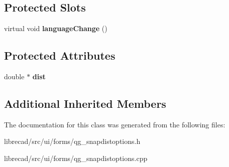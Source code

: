 \subsection*{Protected Slots}
\begin{DoxyCompactItemize}
\item 
\hypertarget{classQG__SnapDistOptions_af7fef0049e470377c1df7c0a3eab6d33}{virtual void {\bfseries language\-Change} ()}\label{classQG__SnapDistOptions_af7fef0049e470377c1df7c0a3eab6d33}

\end{DoxyCompactItemize}
\subsection*{Protected Attributes}
\begin{DoxyCompactItemize}
\item 
\hypertarget{classQG__SnapDistOptions_accbfead11adaa6cb8bdb98c665ec1112}{double $\ast$ {\bfseries dist}}\label{classQG__SnapDistOptions_accbfead11adaa6cb8bdb98c665ec1112}

\end{DoxyCompactItemize}
\subsection*{Additional Inherited Members}


The documentation for this class was generated from the following files\-:\begin{DoxyCompactItemize}
\item 
librecad/src/ui/forms/qg\-\_\-snapdistoptions.\-h\item 
librecad/src/ui/forms/qg\-\_\-snapdistoptions.\-cpp\end{DoxyCompactItemize}
